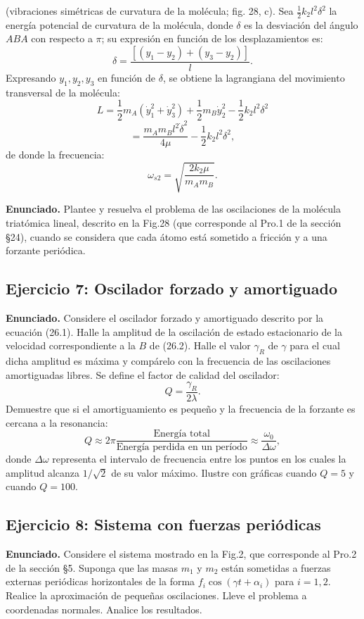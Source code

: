 \documentclass[12pt]{article}
\begin{document}
(vibraciones simétricas de curvatura de la molécula; fig. 28, c). Sea $\frac{1}{2}k_2 l^2 \delta^2$ la energía potencial de curvatura de la molécula, donde $\delta$ es la desviación del ángulo $ABA$ con respecto a $\pi$; su expresión en función de los desplazamientos es:
\[
\delta = \frac{[(y_1 - y_2) + (y_3 - y_2)]}{l}.
\]
Expresando $y_1, y_2, y_3$ en función de $\delta$, se obtiene la lagrangiana del movimiento transversal de la molécula:
\[
L = \frac{1}{2}m_A(\dot{y}_1^2 + \dot{y}_3^2) + \frac{1}{2}m_B\dot{y}_2^2 - \frac{1}{2}k_2 l^2 \delta^2
\]
\[
= \frac{m_A m_B l^2 \dot{\delta}^2}{4\mu} - \frac{1}{2}k_2 l^2 \delta^2,
\]
de donde la frecuencia:
\[
\omega_{s2} = \sqrt{\frac{2k_2 \mu}{m_A m_B}}.
\]

\textbf{Enunciado.} Plantee y resuelva el problema de las oscilaciones de la molécula triatómica lineal, descrito en la Fig.28 (que corresponde al Pro.1 de la sección §24), cuando se considera que cada átomo está sometido a fricción y a una forzante periódica.

\subsection{Ejercicio 7: Oscilador forzado y amortiguado}
\textbf{Enunciado.} Considere el oscilador forzado y amortiguado descrito por la ecuación (26.1). Halle la amplitud de la oscilación de estado estacionario de la velocidad correspondiente a la $B$ de (26.2). Halle el valor $\gamma_R$ de $\gamma$ para el cual dicha amplitud es máxima y compárelo con la frecuencia de las oscilaciones amortiguadas libres. Se define el factor de calidad del oscilador:
\[
Q = \frac{\gamma_R}{2\lambda}.
\]
Demuestre que si el amortiguamiento es pequeño y la frecuencia de la forzante es cercana a la resonancia:
\[
Q \approx 2\pi \frac{\text{Energía total}}{\text{Energía perdida en un período}} \approx \frac{\omega_0}{\Delta \omega},
\]
donde $\Delta \omega$ representa el intervalo de frecuencia entre los puntos en los cuales la amplitud alcanza $1/\sqrt{2}$ de su valor máximo. Ilustre con gráficas cuando $Q = 5$ y cuando $Q = 100$.

\subsection{Ejercicio 8: Sistema con fuerzas periódicas}
\textbf{Enunciado.} Considere el sistema mostrado en la Fig.2, que corresponde al Pro.2 de la sección §5. Suponga que las masas $m_1$ y $m_2$ están sometidas a fuerzas externas periódicas horizontales de la forma $f_i \cos(\gamma t + \alpha_i)$ para $i = 1, 2$. Realice la aproximación de pequeñas oscilaciones. Lleve el problema a coordenadas normales. Analice los resultados.
\end{document}
